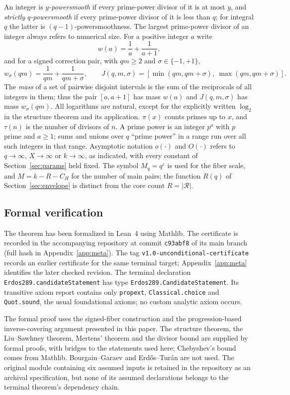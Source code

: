 \documentclass[11pt,letterpaper]{article}
\numberwithin{equation}{section}
\theoremstyle{plain}
\theoremstyle{remark}
\newcommand{\cR}{\mathcal R}
\begin{document}
An integer is \emph{$y$-powersmooth} if every prime-power divisor of it is at most $y$, and \emph{strictly $q$-powersmooth} if every prime-power divisor of it is less than $q$; for integral $q$ the latter is $(q-1)$-powersmoothness. The largest prime-power divisor of an integer always refers to numerical size. For a positive integer $a$ write
\[
w(a)=\frac1a+\frac1{a+1},
\]
and for a signed correction pair, with $qm\ge2$ and $\sigma\in\{-1,+1\}$,
\[
w_\sigma(qm)=\frac1{qm}+\frac1{qm+\sigma},\qquad
J(q,m,\sigma)=[\min(qm,qm+\sigma),\ \max(qm,qm+\sigma)].
\]
The \emph{mass} of a set of pairwise disjoint intervals is the sum of the reciprocals of all integers in them; thus the pair $[a,a+1]$ has mass $w(a)$ and $J(q,m,\sigma)$ has mass $w_\sigma(qm)$. All logarithms are natural, except for the explicitly written $\log_2$ in the structure theorem and its application. $\pi(x)$ counts primes up to $x$, and $\tau(n)$ is the number of divisors of $n$. A prime power is an integer $p^a$ with $p$ prime and $a\ge1$; sums and unions over $q$ ``prime power'' in a range run over all such integers in that range. Asymptotic notation $o(\cdot)$ and $O(\cdot)$ refers to $q\to\infty$, $X\to\infty$ or $k\to\infty$, as indicated, with every constant of Section~\ref{sec:params} held fixed. The symbol $M_q=q^\varepsilon$ is used for the fiber scale, and $M=k-R-C_H$ for the number of main pairs; the function $R(q)$ of Section~\ref{sec:envelope} is distinct from the core count $R=|\cR|$.

\subsection{Formal verification}\label{sec:formal}

The theorem has been formalized in Lean~4 using Mathlib. The certificate is recorded in the accompanying repository \cite{Repo} at commit \texttt{c93abf8} of its main branch (full hash in Appendix~\ref{app:meta}). The tag \texttt{v1.0-unconditional-certificate} records an earlier certificate for the same terminal target; Appendix~\ref{app:meta} identifies the later checked revision. The terminal declaration \texttt{Erdos289.candidateStatement} has type \texttt{Erdos289.CandidateStatement}. Its transitive axiom report contains only \texttt{propext}, \texttt{Classical.choice} and \texttt{Quot.sound}, the usual foundational axioms; no custom analytic axiom occurs.

The formal proof uses the signed-fiber construction and the progression-based inverse-covering argument presented in this paper. The structure theorem, the Liu--Sawhney theorem, Mertens' theorem and the divisor bound are supplied by formal proofs, with bridges to the statements used here; Chebyshev's bound comes from Mathlib. Bourgain--Garaev and Erd\H{o}s--Tur\'an are not used. The original module containing six assumed inputs is retained in the repository as an archival specification, but none of its assumed declarations belongs to the terminal theorem's dependency chain.
\end{document}
